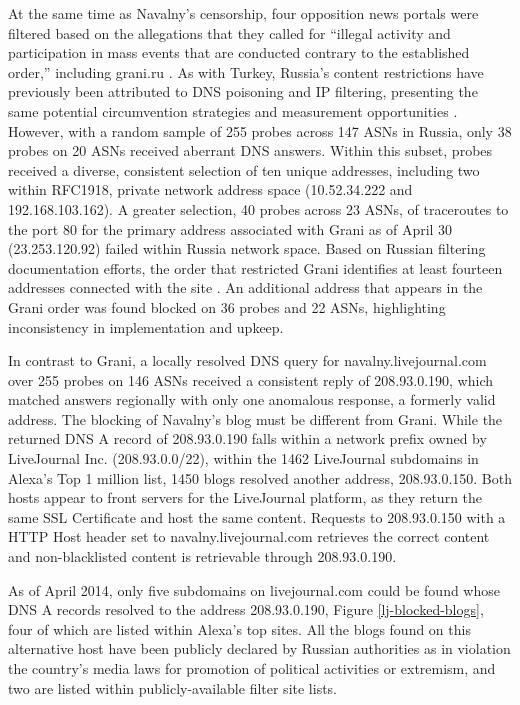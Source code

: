At the same time as Navalny's censorship, four opposition news portals were filtered based on the allegations that they called for ``illegal activity and participation in mass events that are conducted contrary to the established order,'' including grani.ru \cite{ibtimes2014russia}. As with Turkey, Russia's content restrictions have previously been attributed to DNS poisoning and IP filtering, presenting the same potential circumvention strategies and measurement opportunities \cite{rugovdns, verkamp2012inferring}. However, with a random sample of 255 probes across 147 ASNs in Russia, only 38 probes on 20 ASNs received aberrant DNS answers. Within this subset, probes received a diverse, consistent selection of ten unique addresses, including two within RFC1918, private network address space (10.52.34.222 and 192.168.103.162). A greater selection, 40 probes across 23 ASNs, of traceroutes to the port 80 for the primary address associated with Grani as of April 30 (23.253.120.92) failed within Russia network space. Based on Russian filtering documentation efforts, the order that restricted Grani identifies at least fourteen addresses connected with the site \cite{antizapret2014}. An additional address that appears in the Grani order was found blocked on 36 probes and 22 ASNs, highlighting inconsistency in implementation and upkeep.

In contrast to Grani, a locally resolved DNS query for navalny.livejournal.com over 255 probes on 146 ASNs received a consistent reply of 208.93.0.190, which matched answers regionally with only one anomalous response, a formerly valid address. The blocking of Navalny's blog must be different from Grani. While the returned DNS A record of 208.93.0.190 falls within a network prefix owned by LiveJournal Inc. (208.93.0.0/22), within the 1462 LiveJournal subdomains in Alexa's Top 1 million list, 1450 blogs resolved another address, 208.93.0.150. Both hosts appear to front servers for the LiveJournal platform, as they return the same SSL Certificate and host the same content. Requests to 208.93.0.150 with a HTTP Host header set to navalny.livejournal.com retrieves the correct content and non-blacklisted content is retrievable through 208.93.0.190.

As of April 2014, only five subdomains on livejournal.com could be found whose DNS A records resolved to the address 208.93.0.190, Figure \ref{lj-blocked-blogs}, four of which are listed within Alexa's top sites. All the blogs found on this alternative host have been publicly declared by Russian authorities as in violation the country's media laws for promotion of political activities or extremism, and two are listed within publicly-available filter site lists. 

